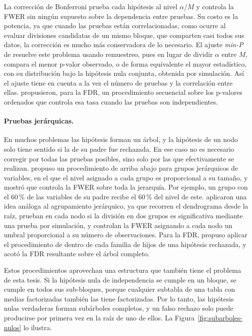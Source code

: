 La corrección de Bonferroni prueba cada hipótesis al nivel $\alpha/M$ y controla la
FWER sin ningún supuesto sobre la dependencia entre pruebas. Su costo es la
potencia, ya que cuando las pruebas están correlacionadas, como ocurre al evaluar
divisiones candidatas de un mismo bloque, que comparten casi todos sus datos, la
corrección es mucho más conservadora de lo necesario. El ajuste \emph{min-P} de
\cite{Westfall1993} resuelve este problema usando remuestreo, pues en lugar de dividir
$\alpha$ entre $M$, compara el menor p-valor observado, o de forma equivalente el
mayor estadístico, con su distribución bajo la hipótesis nula conjunta, obtenida
por simulación. Así el ajuste tiene en cuenta a la vez el número de pruebas y la
correlación entre ellas. \cite{Benjamini1995} propusieron, para la FDR, un
procedimiento secuencial sobre los p-valores ordenados que controla esa tasa
cuando las pruebas son independientes.

\paragraph{Pruebas jerárquicas.} En muchos problemas las hipótesis forman un
árbol, y la hipótesis de un nodo solo tiene sentido si la de su padre fue
rechazada. En ese caso no es necesario corregir por todas las pruebas posibles,
sino solo por las que efectivamente se realizan. \cite{Meinshausen2008} propuso un
procedimiento de arriba abajo para grupos jerárquicos de variables, en el que el
nivel asignado a cada grupo es proporcional a su tamaño, y mostró que controla la FWER sobre toda la jerarquía. Por ejemplo, un grupo con el 60\,\% de las variables de su padre recibe el 60\,\% del nivel de este. \cite{Kimes2017} aplicaron una idea análoga al
agrupamiento jerárquico, ya que recorren el dendrograma desde la raíz, prueban en cada
nodo si la división en dos grupos es significativa mediante una prueba por
simulación, y controlan la FWER asignando a cada nodo un umbral proporcional a su
número de observaciones. Para la FDR, \cite{Yekutieli2008} propuso aplicar el
procedimiento de \cite{Benjamini1995} dentro de cada familia de hijos de una
hipótesis rechazada, y acotó la FDR resultante sobre el árbol completo.

Estos procedimientos aprovechan una estructura que también tiene el problema de
esta tesis. Si la hipótesis nula de independencia se cumple en un bloque, se
cumple en todos sus sub-bloques, porque cualquier subtabla de una tabla con medias
factorizadas también las tiene factorizadas. Por lo tanto, las hipótesis nulas
verdaderas forman subárboles completos, y un falso rechazo solo puede producirse
por primera vez en la raíz de uno de ellos.
 La Figura~\ref{fig:subarboles-nulos} lo ilustra.

